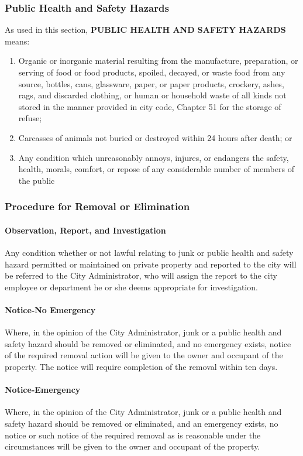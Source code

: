 \subsubsection{Public Health and Safety Hazards}
As used in this section, \textbf{PUBLIC HEALTH AND SAFETY HAZARDS} means:
\begin{enumerate}[{\indent}a)]
    \item Organic or inorganic material resulting from the manufacture, preparation, or serving of food or food products, spoiled, decayed, or waste food from any source, bottles, cans, glassware, paper, or paper products, crockery, ashes, rags, and discarded clothing, or human or household waste of all kinds not stored in the manner provided in city code, Chapter 51 for the storage of refuse; 
    \item Carcasses of animals not buried or destroyed within 24 hours after death; or 
    \item Any condition which unreasonably annoys, injures, or endangers the safety, health, morals, comfort, or repose of any considerable number of members of the public 
\end{enumerate}
\subsubsection{Procedure for Removal or Elimination}
\paragraph{Observation, Report, and Investigation}
Any condition whether or not lawful relating to junk or public health and safety hazard permitted or maintained on private property and reported to the city will be referred to the City Administrator, who will assign the report to the city employee or department he or she deems appropriate for investigation.
\paragraph{Notice-No Emergency}
Where, in the opinion of the City Administrator, junk or a public health and safety hazard should be removed or eliminated, and no emergency exists, notice of the required removal action will be given to the owner and occupant of the property.  The notice will require completion of the removal within ten days.
\paragraph{Notice-Emergency}
Where, in the opinion of the City Administrator, junk or a public health and safety hazard should be removed or eliminated, and an emergency exists, no notice or such notice of the required removal as is reasonable under the circumstances will be given to the owner and occupant of the property.
